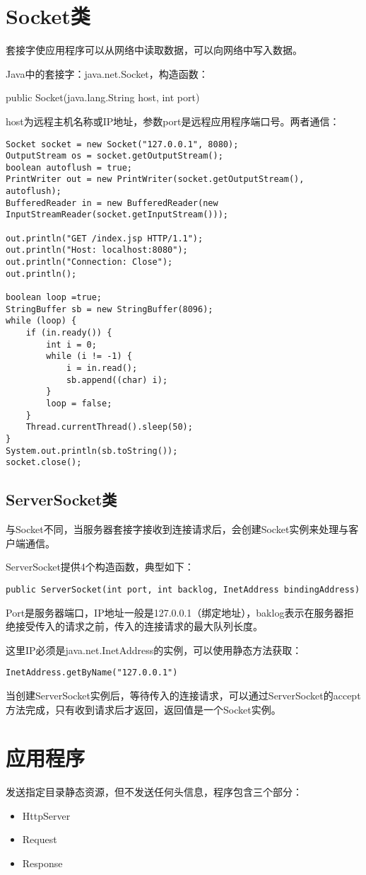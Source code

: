 \section{Socket类}
套接字使应用程序可以从网络中读取数据，可以向网络中写入数据。
\par Java中的套接字：java.net.Socket，构造函数：
\par \qquad public Socket(java.lang.String host, int port)
\par host为远程主机名称或IP地址，参数port是远程应用程序端口号。两者通信：
\begin{lstlisting}
Socket socket = new Socket("127.0.0.1", 8080);
OutputStream os = socket.getOutputStream();
boolean autoflush = true;
PrintWriter out = new PrintWriter(socket.getOutputStream(), autoflush);
BufferedReader in = new BufferedReader(new InputStreamReader(socket.getInputStream()));

out.println("GET /index.jsp HTTP/1.1");
out.println("Host: localhost:8080");
out.println("Connection: Close");
out.println();

boolean loop =true;
StringBuffer sb = new StringBuffer(8096);
while (loop) {
	if (in.ready()) {
		int i = 0;
		while (i != -1) {
			i = in.read();
			sb.append((char) i);
		}
		loop = false;
	}
	Thread.currentThread().sleep(50);
}
System.out.println(sb.toString());
socket.close();
\end{lstlisting}
\subsection{ServerSocket类}
与Socket不同，当服务器套接字接收到连接请求后，会创建Socket实例来处理与客户端通信。
\par ServerSocket提供4个构造函数，典型如下：
\begin{lstlisting}
public ServerSocket(int port, int backlog, InetAddress bindingAddress)
\end{lstlisting}
Port是服务器端口，IP地址一般是127.0.0.1（绑定地址），baklog表示在服务器拒绝接受传入的请求之前，传入的连接请求的最大队列长度。
\par 这里IP必须是java.net.InetAddress的实例，可以使用静态方法获取：
\begin{lstlisting}
InetAddress.getByName("127.0.0.1")
\end{lstlisting}
当创建ServerSocket实例后，等待传入的连接请求，可以通过ServerSocket的accept方法完成，只有收到请求后才返回，返回值是一个Socket实例。
\section{应用程序}
发送指定目录静态资源，但不发送任何头信息，程序包含三个部分：
\begin{itemize}
	\item HttpServer
	\item Request
	\item Response
\end{itemize}
